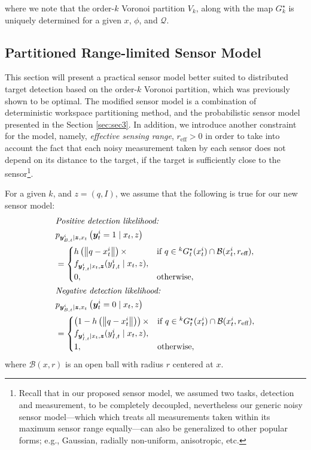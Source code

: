 \documentclass[journal]{IEEEtran}
\begin{document}
\noindent where we note that the order-$k$ Voronoi partition $V_k$, along with the map $G_k^{\star}$ is uniquely determined for a given $x$, $\phi$, and $\mathcal{Q}$. 

\subsection{Partitioned Range-limited Sensor Model}
This section will present a practical sensor model better suited to distributed target detection based on the order-$k$ Voronoi partition, which was previously shown to be optimal.
The modified sensor model is a combination of deterministic workspace partitioning method, and the probabilistic sensor model presented in the Section \ref{sec:sec3}. In addition, we introduce another constraint for the model, namely, \emph{effective sensing range},  $r_{\text{eff}} >0$ in order to take into account the fact that each noisy measurement taken by each sensor does not depend on its distance to the target, if the target is sufficiently close to the sensor\footnote{Recall that in our proposed sensor model, we assumed two tasks, detection and measurement, to be completely decoupled, nevertheless our generic noisy sensor model---which which treats all measurements taken within its maximum sensor range equally---can also be generalized to other popular forms; e.g., Gaussian, radially non-uniform, anisotropic, etc.}. 

For a given $k$, and $z = (q,I)$, we assume that the following is true for our new sensor model:
\begin{align}
&\textit{Positive detection likelihood:} \nonumber \\
&p_{\bm{y}_{B,t}^i \mid \bm{z},x_t
}\left(\bm{y}_t^i = 1 \mid x_t,z
\right) \nonumber\\
&=\begin{cases}
h\left(\left\|q-x_t^i \right\|\right) \times & \textup{if }q \in {}^kG_t^{\star}(x_t^i)
\cap \mathcal{B}(x_t^i,r_{\text{eff}})
,\nonumber \\
f_{\bm{y}_{I,t}^i \mid x_t,\bm{z}}(y_{I,t}^i \mid x_t,z),  \\
0, & \textup{otherwise},
\end{cases}\nonumber \\
&\textit{Negative detection likelihood:} \nonumber\\
&p_{\bm{y}_{B,t}^i \mid \bm{z},x_t
}\left(\bm{y}_t^i = 0 \mid x_t,z
\right)\nonumber  \\
&=\begin{cases}
\left(1-h\left(\left\|q-x_t^i \right\|\right)\right) \times & \textup{if }q \in {}^kG_t^{\star}(x_t^i) \cap \mathcal{B}(x_t^i,r_{\text{eff}}), \\
f_{\bm{y}_{I,t}^i \mid x_t,\bm{z}}(y_{I,t}^i \mid x_t,z), \\
1,  & \textup{otherwise},
\end{cases}
\label{sensorf}
\end{align}
where $\mathcal{B}(x,r)$ is an open ball with radius $r$ centered at $x$.
\end{document}
